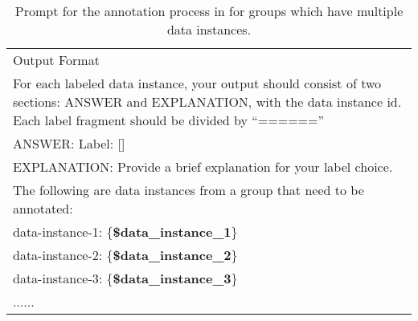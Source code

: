 \begin{table*}[h]
\begin{tabular}{@{}p{\textwidth}@{}}
        Output Format\\
        For each labeled data instance, your output should consist of two sections: ANSWER and EXPLANATION, with the data instance id. Each label fragment should be divided by ``======''\\
        ANSWER: Label: []\\
        EXPLANATION: Provide a brief explanation for your label choice.\\
        The following are data instances from a group that need to be annotated:\\
        data-instance-1: \{\textbf{\$data\_instance\_1}\}\\
        data-instance-2: \{\textbf{\$data\_instance\_2}\}\\
        data-instance-3: \{\textbf{\$data\_instance\_3}\}\\
        ......\\
        \hline
    \end{tabular}
    \caption{Prompt for the annotation process in \system for groups which have multiple data instances.}
    \label{tab:main-multi-prompt}
\end{table*}



